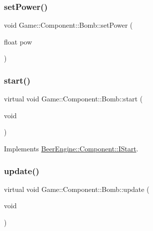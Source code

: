 \subsubsection{\texorpdfstring{set\+Power()}{setPower()}}
{\footnotesize\ttfamily void Game\+::\+Component\+::\+Bomb\+::set\+Power (\begin{DoxyParamCaption}\item[{float}]{pow }\end{DoxyParamCaption})}

\mbox{\label{class_game_1_1_component_1_1_bomb_a74e5f8e628a9d434f0faf91273f33990}} 
\subsubsection{\texorpdfstring{start()}{start()}}
{\footnotesize\ttfamily virtual void Game\+::\+Component\+::\+Bomb\+::start (\begin{DoxyParamCaption}\item[{void}]{ }\end{DoxyParamCaption})\hspace{0.3cm}{\ttfamily [virtual]}}



Implements \mbox{\hyperlink{class_beer_engine_1_1_component_1_1_i_start_aa3e25e86e20c46cdaefc6f6d7f21e495}{Beer\+Engine\+::\+Component\+::\+I\+Start}}.

\mbox{\label{class_game_1_1_component_1_1_bomb_a6685384996c92b8d3f0955c2f6a335b5}} 
\subsubsection{\texorpdfstring{update()}{update()}}
{\footnotesize\ttfamily virtual void Game\+::\+Component\+::\+Bomb\+::update (\begin{DoxyParamCaption}\item[{void}]{ }\end{DoxyParamCaption})\hspace{0.3cm}{\ttfamily [virtual]}}



